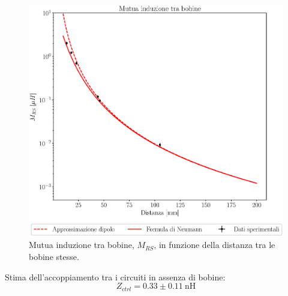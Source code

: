 \documentclass{article}
\begin{document}
\begin{figure}[h!]
    \centering
    \includegraphics[scale = 0.55]{Grafici/induttanza.eps}
    \caption{Mutua induzione tra bobine, $M_{RS}$, in funzione della distanza tra le bobine stesse.}
    \label{fig:induzione}
\end{figure}
Stima dell'accoppiamento tra i circuiti in assenza di bobine:
$$ Z_{ctrl} = 0.33\pm0.11~\si{\nano\henry}$$
\end{document}
